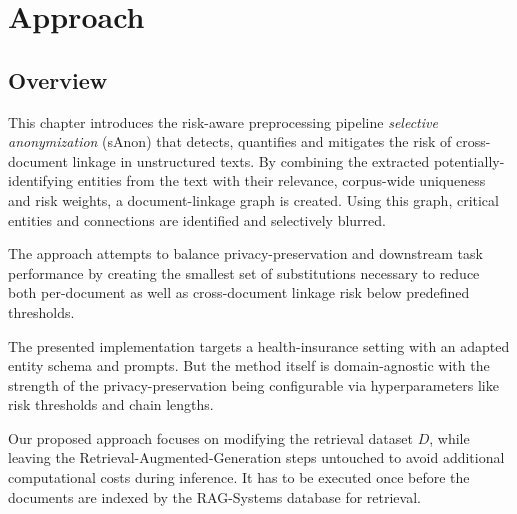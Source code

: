 \chapter{Approach}\label{chapter:approach}

\section{Overview}
This chapter introduces the risk-aware preprocessing pipeline \textit{selective anonymization} (sAnon) that detects, quantifies and mitigates the risk of cross-document linkage in unstructured texts. By combining the extracted potentially-identifying entities from the text with their relevance, corpus-wide uniqueness and risk weights, a document-linkage graph is created. Using this graph, critical entities and connections are identified and selectively blurred.

The approach attempts to balance privacy-preservation and downstream task performance by creating the smallest set of substitutions necessary to reduce both per-document as well as cross-document linkage risk below predefined thresholds.

The presented implementation targets a health-insurance setting with an adapted entity schema and prompts. But the method itself is domain-agnostic with the strength of the privacy-preservation being configurable via hyperparameters like risk thresholds and chain lengths.

Our proposed approach focuses on modifying the retrieval dataset $D$, while leaving the Retrieval-Augmented-Generation steps untouched to avoid additional computational costs during inference. It has to be executed once before the documents are indexed by the \ac{RAG}-Systems database for retrieval.

